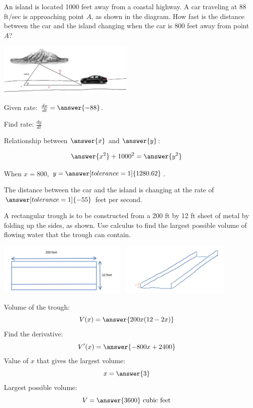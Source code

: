 \documentclass{ximera}
\begin{document}
\begin{problem}\label{prob:mth240exam2prob2}
An island is located 1000 feet away from a coastal highway.  A car traveling at 88 ft/sec is approaching point $A$, as shown in the diagram.  How fast is the distance between the car and the island changing when the car is 800 feet away from point $A$?
\begin{image}
   
\includegraphics[height=1in]{Inkedtest2image4.jpg}~
 
\end{image}

Given rate: $\frac{dx}{dt}=\answer{-88}$.

Find rate:  $\frac{dy}{dt}$

Relationship between $\answer{x}$ and $\answer{y}$:

$$\answer{x^2}+1000^2=\answer{y^2}$$

When $x=800$, $y=\answer[tolerance=1]{1280.62}$.

The distance between the car and the island is changing at the rate of $\answer[tolerance=1]{-55}$ feet per second.
\end{problem}

\begin{problem}\label{prob:mth240exam2prob3}
A rectangular trough is to be constructed from a 200 ft by 12 ft sheet of metal by folding up the sides, as shown.  Use calculus to find the largest possible volume of flowing water that the trough can contain.

\begin{image}
   
\includegraphics[height=1in]{test2image2new.jpg}~
\includegraphics[height=1in]{Inkedtest2image3.jpg}~

\end{image}
Volume of the trough:
$$V(x)=\answer{200x(12-2x)}$$
Find the derivative:
$$V'(x)=\answer{-800x+2400}$$
Value of $x$ that gives the largest volume:
$$x=\answer{3}$$
Largest possible volume:
$$V=\answer{3600}\mbox{ cubic feet}$$

\end{problem}
\end{document}
